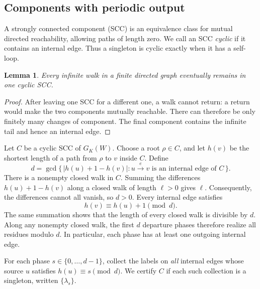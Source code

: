 \documentclass[11pt,reqno]{amsart}
\newtheorem{lemma}[theorem]{Lemma}
\theoremstyle{definition}
\theoremstyle{remark}
\begin{document}
\subsection{Components with periodic output}\label{sec:3.2}

A strongly connected component (SCC) is an equivalence class for mutual
directed reachability, allowing paths of length zero. We call an SCC
\emph{cyclic} if it contains an internal edge. Thus a singleton is cyclic
exactly when it has a self-loop.

\begin{samepage}
\begin{lemma}\leavevmode\label{thm:6}
Every infinite walk in a finite directed graph eventually
remains in one cyclic SCC.
\label{thm-end:6}
\end{lemma}
\end{samepage}

\begin{proof}\leavevmode\label{proof:6}
After leaving one SCC for a different one, a walk cannot return:
a return would make the two components mutually reachable. There can
therefore be only finitely many changes of component. The final component
contains the infinite tail and hence an internal edge. \qedhere
\end{proof}

Let \(C\) be a cyclic SCC of \(G_K(W)\). Choose a root \(\rho\in C\),
and let \(h(v)\) be the shortest length of a path from \(\rho\) to \(v\)
inside \(C\). Define
\[
d=\gcd\{\,|h(u)+1-h(v)|:
u\xrightarrow{e}v\text{ is an internal edge of }C\,\}.
\tag{14}\label{eq:14}
\]
There is a nonempty closed walk in \(C\). Summing the differences
\(h(u)+1-h(v)\) along a closed walk of length \(\ell>0\) gives
\(\ell\). Consequently, the differences cannot all vanish, so \(d>0\).
Every internal edge satisfies
\[
h(v)\equiv h(u)+1\pmod d.
\tag{15}\label{eq:15}
\]
The same summation shows that the length of every closed walk is divisible
by \(d\). Along any nonempty closed walk, the first \(d\) departure
phases therefore realize all residues modulo \(d\). In particular, each
phase has at least one outgoing internal edge.

For each phase \(s\in\{0,\ldots,d-1\}\), collect the labels on \emph{all}
internal edges whose source \(u\) satisfies \(h(u)\equiv s\pmod d\).
We certify \(C\) if each such collection is a singleton, written
\(\{\lambda_s\}\).
\end{document}
